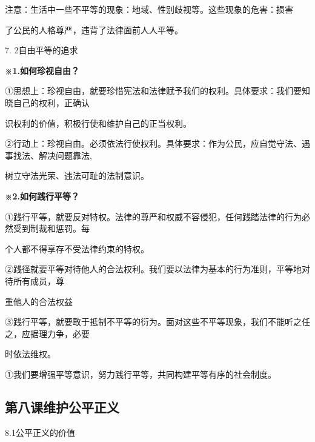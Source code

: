 \documentclass[lang=cn,11pt]{elegantbook}
\newcommand{\daofasym}[1]{{\daofasymbolfont #1}}
\newcommand{\daofasym}[1]{#1}
\begin{document}
注意：生活中一些不平等的现象：地域、性别歧视等。这些现象的危害：损害\par

了公民的人格尊严，违背了法律面前人人平等。\par

7. 2自由平等的追求\par

\textbf{※1.如何珍视自由？}\par

\daofasym{①}思想上：珍视自由，就要珍惜宪法和法律赋予我们的权利。具体要求：我们要知晓自己的权利，正确认\par

识权利的价值，积极行使和维护自己的正当权利。\par

\daofasym{②}行动上：珍视自由。必须依法行使权利。具体要求：作为公民，应自觉守法、遇事找法、解决问题靠法,\par

树立守法光荣、违法可耻的法制意识。\par

\textbf{※2.如何践行平等？}\par

\daofasym{①}践行平等，就要反对特权。法律的尊严和权威不容侵犯，任何践踏法律的行为必然受到制裁和惩罚。每\par

个人都不得享存不受法律约束的特权。\par

\daofasym{②}践径就要平等对待他人的合法权利。我们要以法律为基本的行为准则，平等地对待所有成员，尊\par

重他人的合法权益\par

\daofasym{③}践行平等，就要敢于抵制不平等的衍为。面对这些不平等现象，我们不能听之任之，应据理力争，必要\par

时依法维权。\par

\daofasym{①}我们要增强平等意识，努力践行平等，共同构建平等有序的社会制度。\par

\subsection*{第八课维护公平正义}

8.1公平正义的价值\par
\end{document}
